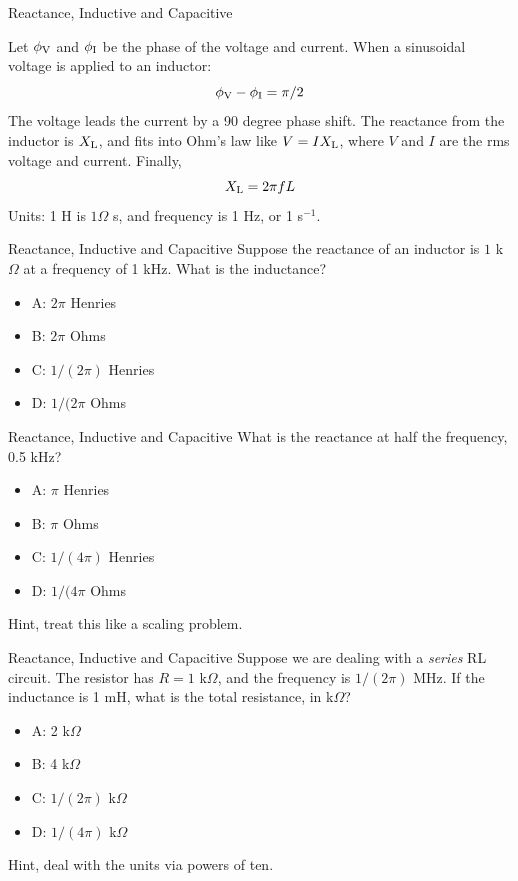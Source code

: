 \documentclass{beamer}
\begin{document}
\begin{frame}{Reactance, Inductive and Capacitive}
\begin{tcolorbox}[colback=white,colframe=black!40!black,title=Reactance and Inductors]
\alert{Let $\phi_{\rm V}$ and $\phi_{\rm I}$ be the phase of the voltage and current.  When a sinusoidal voltage is applied to an inductor:
\begin{equation}
\phi_{\rm V} - \phi_{\rm I} = \pi/2
\end{equation}
The voltage leads the current by a 90 degree phase shift.  The reactance from the inductor is $X_{\rm L}$, and fits into Ohm's law like $V = I X_{\rm L}$, where $V$ and $I$ are the rms voltage and current.  Finally,
\begin{equation}
X_{\rm L} = 2\pi f L
\end{equation}
\footnotesize
Units: 1 H is $1 \Omega$ s, and frequency is 1 Hz, or 1 s$^{-1}$.}
\end{tcolorbox}
\end{frame}

\begin{frame}{Reactance, Inductive and Capacitive}
Suppose the reactance of an inductor is $1$ k$\Omega$ at a frequency of 1 kHz.  What is the inductance?
\begin{itemize}
\item A: $2\pi$ Henries
\item B: $2\pi$ Ohms
\item C: $1/(2\pi)$ Henries
\item D: $1/(2\pi$ Ohms
\end{itemize}
\end{frame}

\begin{frame}{Reactance, Inductive and Capacitive}
What is the reactance at half the frequency, 0.5 kHz?
\begin{itemize}
\item A: $\pi$ Henries
\item B: $\pi$ Ohms
\item C: $1/(4\pi)$ Henries
\item D: $1/(4\pi$ Ohms
\end{itemize}
\footnotesize
Hint, treat this like a scaling problem.
\end{frame}

\begin{frame}{Reactance, Inductive and Capacitive}
Suppose we are dealing with a \textit{series} RL circuit.  The resistor has $R = 1$ k$\Omega$, and the frequency is $1/(2\pi)$ MHz.  If the inductance is 1 mH, what is the total resistance, in k$\Omega$?
\begin{itemize}
\item A: 2 k$\Omega$
\item B: 4 k$\Omega$
\item C: $1/(2\pi)$ k$\Omega$
\item D: $1/(4\pi)$ k$\Omega$
\end{itemize}
\footnotesize
Hint, deal with the units via powers of ten.
\end{frame}
\end{document}
